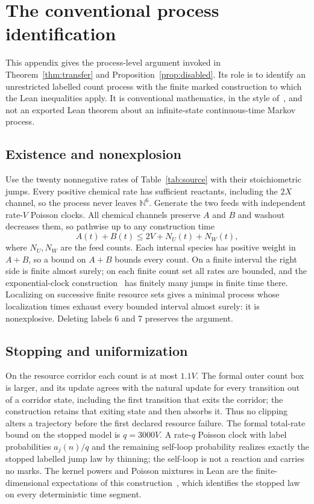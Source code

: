 \documentclass[11pt,a4paper]{article}
\theoremstyle{plain}
\theoremstyle{definition}
\theoremstyle{remark}
\newcommand{\N}{\mathbb N}
\begin{document}
\appendix

\section{The conventional process identification}\label{app:process}
This appendix gives the process-level argument invoked in Theorem~\ref{thm:transfer} and Proposition~\ref{prop:disabled}. Its role is to identify an unrestricted labelled count process with the finite marked construction to which the Lean inequalities apply. It is conventional mathematics, in the style of~\citep{anderson2015}, and not an exported Lean theorem about an infinite-state continuous-time Markov process.

\subsection{Existence and nonexplosion}
Use the twenty nonnegative rates of Table~\ref{tab:source} with their stoichiometric jumps. Every positive chemical rate has sufficient reactants, including the $2X$ channel, so the process never leaves $\N^6$. Generate the two feeds with independent rate-$V$ Poisson clocks. All chemical channels preserve $A$ and $B$ and washout decreases them, so pathwise up to any construction time
\[
 A(t)+B(t)\le2V+N_U(t)+N_W(t),
\]
where $N_U,N_W$ are the feed counts. Each internal species has positive weight in $A+B$, so a bound on $A+B$ bounds every count. On a finite interval the right side is finite almost surely; on each finite count set all rates are bounded, and the exponential-clock construction~\citep{gillespie1977} has finitely many jumps in finite time there. Localizing on successive finite resource sets gives a minimal process whose localization times exhaust every bounded interval almost surely: it is nonexplosive. Deleting labels 6 and 7 preserves the argument.

\subsection{Stopping and uniformization}
On the resource corridor each count is at most $1.1V$. The formal outer count box is larger, and its update agrees with the natural update for every transition out of a corridor state, including the first transition that exits the corridor; the construction retains that exiting state and then absorbs it. Thus no clipping alters a trajectory before the first declared resource failure. The formal total-rate bound on the stopped model is $q=3000V$. A rate-$q$ Poisson clock with label probabilities $a_j(n)/q$ and the remaining self-loop probability realizes exactly the stopped labelled jump law by thinning; the self-loop is not a reaction and carries no marks. The kernel powers and Poisson mixtures in Lean are the finite-dimensional expectations of this construction~\citep{jensen1953,grassmann1977}, which identifies the stopped law on every deterministic time segment.
\end{document}
